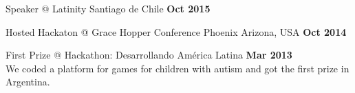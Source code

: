 \documentclass[margin,line]{resume}
\begin{document}
\begin{resume}
\begin{list2}
\item Speaker @ Latinity Santiago de Chile \textbf{Oct 2015}

\item Hosted Hackaton @ Grace Hopper Conference Phoenix Arizona, USA \hfill \textbf{Oct 2014} 

\item First Prize @ Hackathon: Desarrollando Am\'erica Latina \hfill \textbf{Mar 2013} \\
We coded a platform for games for children with autism and got the first prize in Argentina.
\end{list2}



    

\end{resume}
\end{document}
